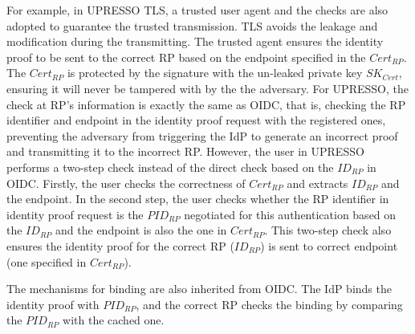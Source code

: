 For example, in UPRESSO TLS, a trusted user agent and the checks are also adopted to guarantee the trusted transmission. TLS avoids the leakage and modification during the transmitting. The trusted agent ensures the identity proof to be sent to the correct RP based on the endpoint specified in the $Cert_{RP}$. The  $Cert_{RP}$ is protected by the signature with the un-leaked private key $SK_{Cert}$, ensuring it  will never be tampered with by the the adversary. For UPRESSO, the check at RP's information is exactly the same as OIDC, that is, checking the RP identifier and endpoint in the identity proof request with the registered ones, preventing the adversary from triggering the IdP to generate an incorrect proof and transmitting it to the incorrect RP. However, the user in UPRESSO performs a two-step check instead of the direct check based on the $ID_{RP}$ in OIDC. Firstly, the user checks the correctness of $Cert_{RP}$ and extracts  $ID_{RP}$ and the endpoint. In the second step, the user checks whether the RP identifier in identity proof request is the $PID_{RP}$ negotiated for this authentication based on the $ID_{RP}$ and the endpoint is also the one in $Cert_{RP}$. This two-step check also ensures the identity proof for the correct RP ($ID_{RP}$) is sent to correct endpoint (one specified in $Cert_{RP}$).

The mechanisms for binding are also inherited from OIDC. The IdP binds the identity proof with $PID_{RP}$, and the correct RP checks the binding by comparing the $PID_{RP}$ with the cached one.

